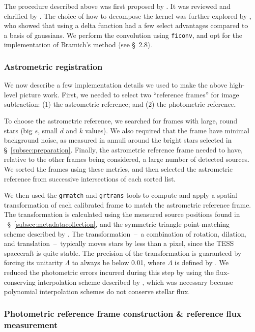 \documentclass[12pt,twocolumn,tighten]{aastex62}
\begin{document}
The procedure described above was first proposed by \citet{Alard_Lupton_1998}.
It was reviewed and clarified by \citet{miller_optimal_2008}.
The choice of how to decompose the kernel was further explored by
\citet{bramich_new_2008}, who showed that using a delta function
had a few select advantages compared to a basis of gaussians.
We perform the convolution using \texttt{ficonv}, and opt for
the implementation of Bramich's method (see \citealt{Pal_2009} \S~2.8).


\subsubsection{Astrometric registration}
We now describe a few implementation details we used to make the
above high-level picture work.
First, we needed to select two ``reference frames'' for image subtraction:
(1) the astrometric reference; and (2) the photometric reference.

To choose the astrometric reference, we searched for frames with
large, round stars (big $s$, small $d$ and $k$ values).
We also required
that the frame have minimal background noise, as measured in annuli
around the bright stars selected in \S~\ref{subsec:preparation}.
Finally, the astrometric reference frame needed to have, relative to the 
other frames being
considered, a large number of detected sources.
We sorted the frames using these metrics, and then selected the
astrometric reference from successive intersections of each sorted
list.

We then
used the \texttt{grmatch} and \texttt{grtrans} tools to
compute and apply a spatial transformation of each calibrated frame
to match the astrometric reference frame.
The transformation is calculated using the measured source positions
found in ~\S~\ref{subsec:metadatacollection},
and the symmetric triangle point-matching scheme described
by \citet[][~\S~2.5.2]{Pal_2009}.
The transformation~--~a combination of rotation, dilation, and
translation~--~typically moves stars by less than a pixel, since
the TESS spacecraft is quite stable.
The precision of the transformation is guaranteed by forcing 
its unitarity $\Lambda$ to always be below 0.01, where 
$\Lambda$ is defined by \citet[][~Eq.~54]{Pal_2009}.
We reduced the photometric errors
incurred during this step by using
the flux-conserving interpolation
scheme described by \citet{Pal_2009},
which was necessary because polynomial interpolation schemes
do not conserve stellar flux. 

\subsubsection{Photometric reference frame construction \& reference flux measurement}
\end{document}
